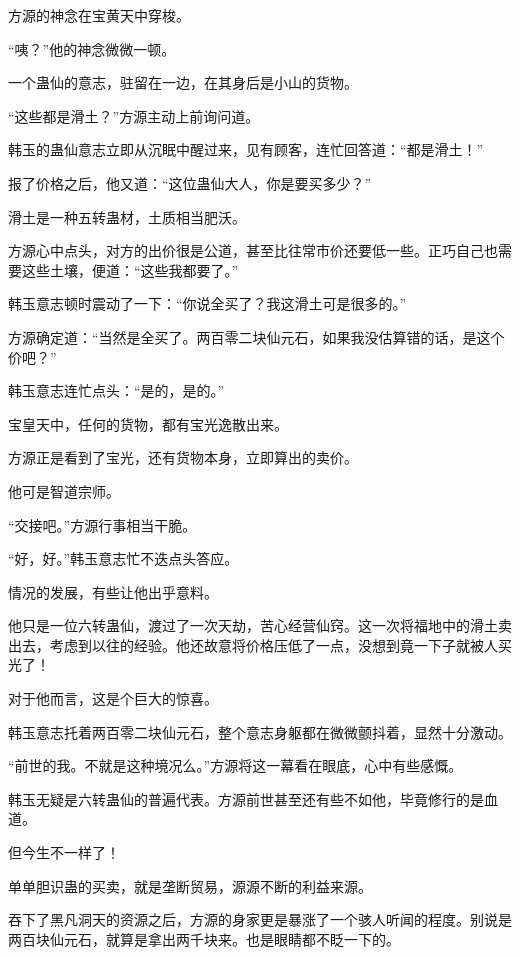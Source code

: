 
\begin{this_body}

方源的神念在宝黄天中穿梭。

“咦？”他的神念微微一顿。

一个蛊仙的意志，驻留在一边，在其身后是小山的货物。

“这些都是滑土？”方源主动上前询问道。

韩玉的蛊仙意志立即从沉眠中醒过来，见有顾客，连忙回答道：“都是滑土！”

报了价格之后，他又道：“这位蛊仙大人，你是要买多少？”

滑土是一种五转蛊材，土质相当肥沃。

方源心中点头，对方的出价很是公道，甚至比往常市价还要低一些。正巧自己也需要这些土壤，便道：“这些我都要了。”

韩玉意志顿时震动了一下：“你说全买了？我这滑土可是很多的。”

方源确定道：“当然是全买了。两百零二块仙元石，如果我没估算错的话，是这个价吧？”

韩玉意志连忙点头：“是的，是的。”

宝皇天中，任何的货物，都有宝光逸散出来。

方源正是看到了宝光，还有货物本身，立即算出的卖价。

他可是智道宗师。

“交接吧。”方源行事相当干脆。

“好，好。”韩玉意志忙不迭点头答应。

情况的发展，有些让他出乎意料。

他只是一位六转蛊仙，渡过了一次天劫，苦心经营仙窍。这一次将福地中的滑土卖出去，考虑到以往的经验。他还故意将价格压低了一点，没想到竟一下子就被人买光了！

对于他而言，这是个巨大的惊喜。

韩玉意志托着两百零二块仙元石，整个意志身躯都在微微颤抖着，显然十分激动。

“前世的我。不就是这种境况么。”方源将这一幕看在眼底，心中有些感慨。

韩玉无疑是六转蛊仙的普遍代表。方源前世甚至还有些不如他，毕竟修行的是血道。

但今生不一样了！

单单胆识蛊的买卖，就是垄断贸易，源源不断的利益来源。

吞下了黑凡洞天的资源之后，方源的身家更是暴涨了一个骇人听闻的程度。别说是两百块仙元石，就算是拿出两千块来。也是眼睛都不眨一下的。


\end{this_body}
